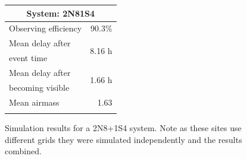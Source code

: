 \begin{colsection}
\begin{colsection}
\begin{figure}[p]
\begin{center}
    \begin{minipage}[t]{0.35\textwidth}\vspace{0pt}
    \begin{tabular}{lr}
    \multicolumn{2}{c}{\textbf{System: 2N8\+1S4}} \\
    \midrule
    Observing efficiency & 90.3\% \\
    \midrule
    Mean delay after     & \multirow{2}{*}{8.16 h} \\
    event time           & \\
    Mean delay after     & \multirow{2}{*}{1.66 h} \\
    becoming visible     & \\
    \midrule
    Mean airmass         & 1.63 \\
    & \\
    \end{tabular}
    \vfill
    \end{minipage}

    \end{center}
    \caption[GW simulation results: 2N8+1S4 system]{
        Simulation results for a 2N8+1S4 system. Note as these sites use different grids they were simulated independently and the results combined.
    }\label{fig:gw_sim_2n8+1s4}
\end{figure}


\begin{figure}[p]
    \begin{center}


\end{center}
\end{figure}
\end{colsection}
\end{colsection}
